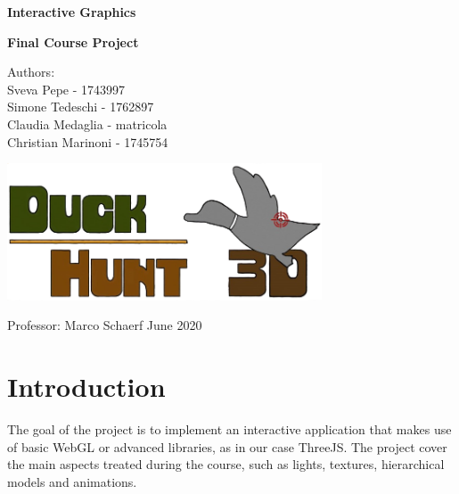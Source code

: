 \documentclass[12pt,a4paper]{article}
\begin{document}
	
	\begin{titlepage}
		\begin{center}
			\vspace*{1cm}
			
			\LARGE
			\textbf{Interactive Graphics}
			
			\large 
			\textbf{Final Course Project}
			
			\vspace{1.5cm}
			Authors: \\
			Sveva Pepe - 1743997 \\ 
			Simone Tedeschi - 1762897 \\
			Claudia Medaglia - matricola \\
			Christian Marinoni - 1745754
			\vfill
			
			\includegraphics[width=0.7\textwidth]{logo}
			
			\vfill
			
			\large
			Professor: Marco Schaerf\break\break\break\break
			June 2020
			
		\end{center}
	\end{titlepage}
	
	\tableofcontents
	\pagebreak
	\section{Introduction}
	The goal of the project is to implement an interactive application 
	that makes use of basic WebGL or advanced libraries, as in our case ThreeJS. The project 
	cover the main aspects treated during the course, such as lights, textures, hierarchical models and animations.
\end{document}
